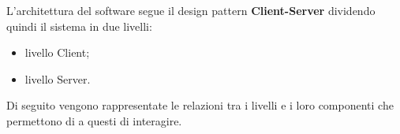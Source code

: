 L'architettura del software segue il design pattern \textbf{Client-Server} dividendo quindi il sistema in due livelli:
\begin{itemize}
	\item{livello Client};
	\item{livello Server}.
\end{itemize}
Di seguito vengono rappresentate le relazioni tra i livelli e i loro componenti che permettono di a questi di interagire.


